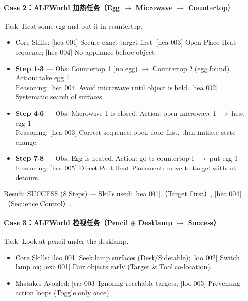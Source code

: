 \documentclass[11pt,UTF8,fontset=fandol]{ctexart}
\begin{document}
\paragraph{Case 2：ALFWorld 加热任务（Egg $\rightarrow$ Microwave $\rightarrow$ Countertop）}
Task: Heat some egg and put it in countertop.
\begin{itemize}[leftmargin=1.5em,itemsep=0.1em]
\item Core Skills: [hea 001] Secure exact target first; [hea 003] Open-Place-Heat sequence; [hea 004] No appliance before object.
\end{itemize}
\begin{itemize}[leftmargin=1.5em,itemsep=0.2em]
\item \textbf{Step 1-3} — Obs: Countertop 1 (no egg) $\rightarrow$ Countertop 2 (egg found). Action: take egg 1\\
  Reasoning: [hea 004] Avoid microwave until object is held. [hea 002] Systematic search of surfaces.
\item \textbf{Step 4-6} — Obs: Microwave 1 is closed. Action: open microwave 1 $\rightarrow$ heat egg 1\\
  Reasoning: [hea 003] Correct sequence: open door first, then initiate state change.
\item \textbf{Step 7-8} — Obs: Egg is heated. Action: go to countertop 1 $\rightarrow$ put egg 1\\
  Reasoning: [hea 005] Direct Post-Heat Placement: move to target without detours.
\end{itemize}
Result: SUCCESS (8 Steps) — Skills used: [hea 001]（Target First）, [hea 004]（Sequence Control）.

\paragraph{Case 3：ALFWorld 检视任务（Pencil $\oplus$ Desklamp $\rightarrow$ Success）}
Task: Look at pencil under the desklamp.
\begin{itemize}[leftmargin=1.5em,itemsep=0.1em]
\item Core Skills: [loo 001] Seek lamp surfaces (Desk/Sidetable); [loo 002] Switch lamp on; [exa 001] Pair objects early (Target \& Tool co-location).
\item Mistakes Avoided: [err 003] Ignoring reachable targets; [loo 005] Preventing action loops (Toggle only once).
\end{itemize}
\end{document}
